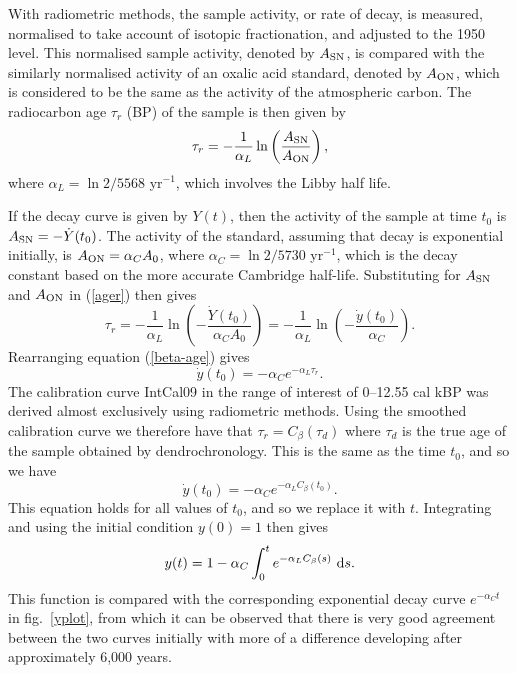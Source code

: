 \documentclass[12pt]{article}
\renewcommand{\Ref}[1]{(\ref{#1})}
\newcommand{\INTCAL}{{\sc IntCal}}
\newcommand{\upd}{{\rm d}}
\begin{document}
With radiometric methods, the sample activity, or rate of decay, is
measured, normalised to take account of isotopic fractionation, and
adjusted to the 1950 level.
This normalised sample activity, denoted by $A_{\rm SN}$, is compared 
with the similarly normalised activity of an oxalic acid standard,
denoted by $A_{\rm ON}$, which is considered to be the same as the activity 
of the atmospheric carbon. The radiocarbon age
$\tau_r$ (BP) of the sample is then given by \cite{stuiver77}
\begin{equation}\label{ager}
\tau_r=-\frac{1}{\alpha_L}\ln\left(\frac{A_{\rm SN}}{A_{\rm ON}}\right),
\end{equation}
where $\alpha_L=\ln 2/5568$ yr$^{-1}$, which involves the Libby half life.

If the decay curve is given by $Y(t)$, then the activity of the sample at
time $t_0$ is $A_{\rm SN}=-\dot Y(t_0)$.
The activity of the standard, assuming that decay is exponential initially,
is $A_{\rm ON}=\alpha_C A_0$,
where $\alpha_C=\ln 2/5730$ yr$^{-1}$, which is the decay constant based on
the more accurate Cambridge half-life. Substituting for $A_{\rm SN}$ and 
$A_{\rm ON}$ in \Ref{ager} then gives
\begin{equation}\label{beta-age}
\tau_r=-\frac{1}{\alpha_L}\ln\left(-\frac{\dot Y(t_0)}{\alpha_C A_0}\right)
=-\frac{1}{\alpha_L}\ln\left(-\frac{\dot y(t_0)}{\alpha_C}\right).
\end{equation}
Rearranging equation \Ref{beta-age} gives
$$\dot y(t_0)=-\alpha_C e^{-\alpha_L\tau_r}.$$
The calibration curve \INTCAL09 in the range of interest of 
0--12.55 cal kBP was derived almost exclusively using radiometric
methods. Using the smoothed calibration curve
we therefore have that $\tau_r=C_\beta(\tau_d)$ where
$\tau_d$ is the true age of the sample obtained by dendrochronology. This
is the same as the time $t_0$, and so we have
$$\dot y(t_0)=-\alpha_C e^{-\alpha_L C_\beta(t_0)}.$$
This equation holds for all values of $t_0$, and so we replace it
with $t$. Integrating and using the initial condition $y(0)=1$ then gives
\begin{equation}\label{yt}
y(t)=1-\alpha_C \int_0^t e^{-\alpha_L C_\beta(s)}~\upd s.
\end{equation}
This function is compared with the corresponding exponential decay curve
$e^{-\alpha_C t}$ in fig.~\ref{yplot}, 
from which it can be observed that there is very good agreement between the
two curves initially with more of a difference developing after
approximately 6,000 years.
\end{document}
